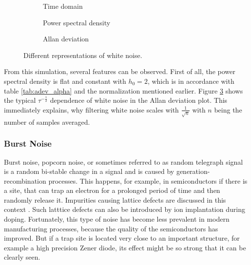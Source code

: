 \begin{figure}[ht]
    \centering
    \begin{subfigure}{0.32\linewidth}
        \centering
        \scalebox{0.75}{%
            
        } %
        \caption{Time domain}
        \label{fig:white_noise_time}
    \end{subfigure}
    \hfill
    \begin{subfigure}{0.32\linewidth}
        \centering
        \scalebox{0.75}{%
            
        } %
        \caption{Power spectral density}
        \label{fig:white_noise_psd}
    \end{subfigure}
    \hfill
    \begin{subfigure}{0.32\linewidth}
        \centering
        \scalebox{0.75}{%
            
        } %
        \caption{Allan deviation}
        \label{fig:white_noise_adev}
    \end{subfigure}
    \caption{Different representations of white noise.}
    \label{fig:white_noise_simulated}
\end{figure}

From this simulation, several features can be observed. First of all, the power spectral density is flat and constant with $h_0 = 2$, which is in accordance with table \ref{tab:adev_alpha} and the normalization mentioned earlier. Figure \ref{fig:white_noise_adev} shows the typical $\tau^{-\frac 1 2}$ dependence of white noise in the Allan deviation plot. This immediately explains, why filtering white noise scales with $\frac{1}{\sqrt{n}}$ with $n$ being the number of samples averaged.

\clearpage
\subsubsection{Burst Noise}%
\label{sec:theory_burst_noise}
Burst noise, popcorn noise, or sometimes referred to as random telegraph signal is a random bi-stable change in a signal and is caused by generation-recombination processes. This happens, for example, in semiconductors if there is a site, that can trap an electron for a prolonged period of time and then randomly release it. Impurities causing lattice defects are discussed in this context \cite{kay2012operational,burst_noise_psd,popcorn_noise_orgin,technote_ti_popcorn_noise}. Such latttice defects can also be introduced by ion implantation during doping. Fortunately, this type of noise has become less prevalent in modern manufacturing processes, because the quality of the semiconductors has improved. But if a trap site is located very close to an important structure, for example a high precision Zener diode, its effect might be so strong that it can be clearly seen.

